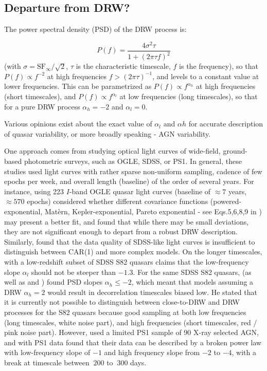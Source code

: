 \documentclass[twocolumn]{aastex62}
\begin{document}
\subsection{Departure from DRW?}

The power spectral density (PSD) of the DRW process is:

\begin{equation}
P(f) = \frac{4\sigma^{2}\tau}{1+(2 \pi \tau f)^{2}}
\end{equation}
(with $\sigma = \mathrm{SF}_{\infty} / \sqrt{2}$, $\tau$ is the characteristic timescale, $f$ is the frequency), so that $P(f) \propto f^{-2}$  at high frequencies $f > (2\pi \tau)^{-1}$, and levels to a constant value at lower frequencies\citep{kelly2014}. This can be parametrized as $P(f) \propto f^{\alpha_h}$ at high frequencies (short timescales), and  $P(f) \propto f^{\alpha_l}$  at low frequencies (long timescales), so that for a pure DRW process $\alpha_{h}=-2$ and $\alpha_{l} = 0$.  

Various opinions exist about the exact value of  $\alpha_{l}$ and $\alpha{h}$ for accurate description of quasar variability,  or more broadly speaking -  AGN variability. 

One approach comes from studying optical light curves of wide-field, ground-based photometric surveys, such as OGLE, SDSS, or PS1. In general, these studies used  light curves with rather sparse non-uniform sampling, cadence of few epochs per week,  and overall length (baseline) of the order of several years.  
For instance, \citep{zu2013}  using 223 $I$-band  OGLE quasar  light curves (baseline of  $\approx7$ years, $\approx570$ epochs) considered whether different covariance functions (powered-exponential, Mat\`ern, Kepler-exponential, Pareto exponential - see Eqs.5,6,8,9 in \citealt{zu2013}) may present a better fit, and found that while there may be small deviations, they are not significant enough to depart from a robust DRW description.  Similarly, \citep{sun2018} found that the data quality of SDSS-like light curves is insufficient to distinguish between CAR(1) and more complex models.   On the longer timescales, \cite{guo2017} with a low-redshift subset of SDSS S82 quasars  claims  that the low-frequency slope  $\alpha_{l}$ should not be steeper than $-1.3$. For the same SDSS S82 quasars,  \citep{kozlowski2017a} (as well as \cite{kozlowski2016b} and \citep{caplar2017}) found PSD slopes $\alpha_{h} \leqslant -2$, which meant that models assuming a DRW $\alpha_{h}=2$ would result in decorrelation timescales biased low. He stated that it is currently not possible to distinguish between close-to-DRW and DRW processes for the S82 quasars because good sampling at both low frequencies (long timescales, white noise part), and high frequencies (short timescales, red / pink noise part). However, \cite{simm2016} used a limited PS1 sample of 90 X-ray selected AGN, and with PS1 data found that their data can be described by a broken power law with low-frequency slope  of $-1$ and high frequency slope from $-2$ to $-4$, with a break at timescale between $~200$ to $~300$ days.   
\end{document}
